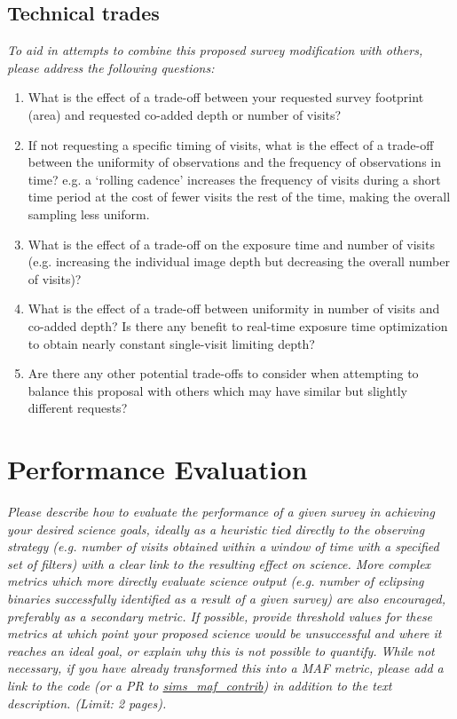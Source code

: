 \documentclass[11pt]{article}
\begin{document}
\subsection{Technical trades}
\begin{footnotesize}
{\it To aid in attempts to combine this proposed survey modification with others, please address the following questions:
\begin{enumerate}
    \item What is the effect of a trade-off between your requested survey footprint (area) and requested co-added depth or number of visits?
    \item If not requesting a specific timing of visits, what is the effect of a trade-off between the uniformity of observations and the frequency of observations in time? e.g. a `rolling cadence' increases the frequency of visits during a short time period at the cost of fewer visits the rest of the time, making the overall sampling less uniform.
    \item What is the effect of a trade-off on the exposure time and number of visits (e.g. increasing the individual image depth but decreasing the overall number of visits)?
    \item What is the effect of a trade-off between uniformity in number of visits and co-added depth? Is there any benefit to real-time exposure time optimization to obtain nearly constant single-visit limiting depth?
    \item Are there any other potential trade-offs to consider when attempting to balance this proposal with others which may have similar but slightly different requests?
\end{enumerate}}
\end{footnotesize}


\clearpage
\section{Performance Evaluation}
\begin{footnotesize}
{\it Please describe how to evaluate the performance of a given survey in achieving your desired science goals, ideally as a heuristic tied directly to the observing strategy (e.g. number of visits obtained within a window of time with a specified set of filters) with a clear link to the resulting effect on science. More complex metrics which more directly evaluate science output (e.g. number of eclipsing binaries successfully identified as a result of a given survey) are also encouraged, preferably as a secondary metric. If possible, provide threshold values for these metrics at which point your proposed science would be unsuccessful and where it reaches an ideal goal, or explain why this is not possible to quantify. While not necessary, if you have already transformed this into a MAF metric, please add a link to the code (or a PR to \href{https://github.com/lsst-nonproject/sims_maf_contrib}{sims\_maf\_contrib}) in addition to the text description. (Limit: 2 pages).}
\end{footnotesize}
\end{document}
